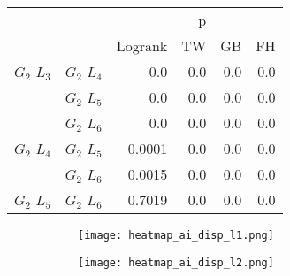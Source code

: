       \begin{table}
        \centering
        \begin{tabular}{llrrrr}
          \toprule
                       &             &         &  p &    &     \\
          \cmidrule{3-6}
                       &             & Logrank & TW & GB & FH  \\
          \midrule
          $G_2$ $L_3$  & $G_2$ $L_4$  &  0.0 &  0.0 &  0.0 &  0.0     \\
                       & $G_2$ $L_5$  & 0.0 & 0.0 & 0.0 & 0.0    \\
                       & $G_2$ $L_6$  & 0.0 & 0.0 & 0.0 & 0.0      \\
          $G_2$ $L_4$  & $G_2$ $L_5$  & 0.0001 & 0.0 & 0.0 & 0.0      \\
                       & $G_2$ $L_6$  & 0.0015 & 0.0 & 0.0 & 0.0       \\
          $G_2$ $L_5$   & $G_2$ $L_6$ & 0.7019 &  0.0 & 0.0 & 0.0      \\
          \bottomrule
        \end{tabular}
        \label{tab:g2_ingroup_tests_disp}
        \caption{}
      \end{table}



      

      \begin{figure}
        \centering
        \begin{subfigure}[b]{0.45\textwidth}
          \texttt{[image: heatmap\_ai\_disp\_l1.png]}
          \caption{}
          \label{fig:heatmap_ai_disp_l1}
        \end{subfigure}
        \begin{subfigure}[b]{0.45\textwidth}
          \texttt{[image: heatmap\_ai\_disp\_l2.png]}
          \caption{}
          \label{fig:heatmap_ai_disp_l2}
        \end{subfigure}
        \caption{}
        \label{fig:heatmap_ai_disp}
      \end{figure}
      
